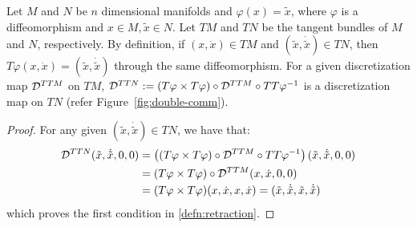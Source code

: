 \begin{prop}
  \label{prop:lift-commutator}
    Let $M$ and $N$ be $n$ dimensional manifolds and $\varphi(x) = \tilde{x}$, where $\varphi$ is a diffeomorphism and $x \in M, \tilde{x} \in N$. Let $TM$ and $TN$ be the tangent bundles of $M$ and $N$, respectively. By definition, if $(x,\dot{x}) \in TM$ and $(\tilde{x}, \dot{\tilde{x}}) \in TN$, then $T\varphi(x,\dot{x}) = (\tilde{x}, \dot{\tilde{x}})$ through the same diffeomorphism. For a given discretization map $\mathcal{D}^{TTM}$ on $TM$, $\mathcal{D}^{TTN} := (T\varphi \times T \varphi) \circ \mathcal{D}^{TTM} \circ TT\varphi^{-1}$ is a discretization map on $TN$ (refer Figure~\ref{fig:double-comm}).
    
    \begin{proof}
        For any given $(\tilde{x}, \dot{\tilde{x}}) \in TN$, we have that:
        \begin{equation*}
        \begin{split}
            \mathcal{D}^{TTN}(\tilde{x}, \dot{\tilde{x}}, 0, 0) & = \left( (T\varphi \times T \varphi) \circ \mathcal{D}^{TTM} \circ TT\varphi^{-1} \right) (\tilde{x}, \dot{\tilde{x}}, 0, 0) \\
            & =  (T\varphi \times T \varphi) \circ \mathcal{D}^{TTM} (x, \dot{x}, 0, 0) \\
            & = (T \varphi \times T \varphi) (x, \dot{x}, x, \dot{x}) = (\tilde{x}, \dot{\tilde{x}}, \tilde{x}, \dot{\tilde{x}})
        \end{split}
        \end{equation*}
        which proves the first condition in \eqref{defn:retraction}.
        

\end{proof}
\end{prop}

